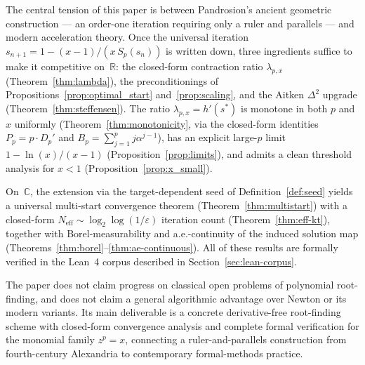 \documentclass[11pt,a4paper]{article}
\theoremstyle{definition}
\begin{document}
The central tension of this paper is between Pandrosion's ancient geometric construction --- an order-one iteration requiring only a ruler and parallels --- and modern acceleration theory. Once the universal iteration $s_{n+1} = 1 - (x-1)/(x\,S_p(s_n))$ is written down, three ingredients suffice to make it competitive on~$\mathbb{R}$: the closed-form contraction ratio $\lambda_{p,x}$ (Theorem~\ref{thm:lambda}), the preconditionings of Propositions~\ref{prop:optimal_start} and~\ref{prop:scaling}, and the Aitken $\Delta^2$ upgrade (Theorem~\ref{thm:steffensen}). The ratio $\lambda_{p,x} = h'(s^*)$ is monotone in both $p$ and $x$ uniformly (Theorem~\ref{thm:monotonicity}, via the closed-form identities $P_p = p \cdot D_p'$ and $B_p = \sum_{j=1}^{p} j\alpha^{j-1}$), has an explicit large-$p$ limit $1 - \ln(x)/(x-1)$ (Proposition~\ref{prop:limits}), and admits a clean threshold analysis for $x < 1$ (Proposition~\ref{prop:x_small}).

On~$\mathbb{C}$, the extension via the target-dependent seed of Definition~\ref{def:seed} yields a universal multi-start convergence theorem (Theorem~\ref{thm:multistart}) with a closed-form $N_{\mathrm{eff}} \sim \log_2\log(1/\varepsilon)$ iteration count (Theorem~\ref{thm:eff-kt}), together with Borel-measurability and a.e.-continuity of the induced solution map (Theorems~\ref{thm:borel}--\ref{thm:ae-continuous}). All of these results are formally verified in the Lean~4 corpus described in Section~\ref{sec:lean-corpus}.

\medskip

The paper does not claim progress on classical open problems of polynomial root-finding, and does not claim a general algorithmic advantage over Newton or its modern variants. Its main deliverable is a concrete derivative-free root-finding scheme with closed-form convergence analysis and complete formal verification for the monomial family $z^p = x$, connecting a ruler-and-parallels construction from fourth-century Alexandria to contemporary formal-methods practice.
\end{document}
